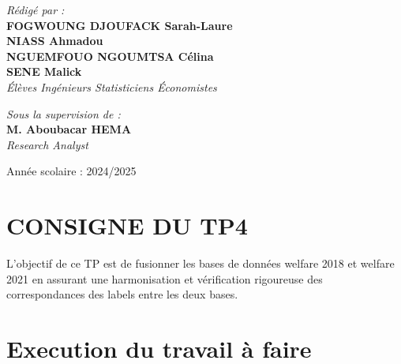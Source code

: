 \documentclass[
]{article}
\begin{document}
\begin{titlepage}
\begin{center}
        \vfill  
        
        \begin{minipage}{0.5\textwidth}
    \begin{flushleft} \large
        \emph{\textsf{Rédigé par :}}\\
        \textbf{FOGWOUNG DJOUFACK Sarah-Laure}\\
        \textbf{NIASS Ahmadou}\\
        \textbf{NGUEMFOUO NGOUMTSA Célina}\\
        \textbf{SENE Malick}\\
        \textit{Élèves Ingénieurs Statisticiens Économistes}
    \end{flushleft}
\end{minipage}
        \hfill
        \begin{minipage}{0.4\textwidth}
            \begin{flushright} \large
                \emph{\textsf{Sous la supervision de :}} \\
                \textbf{M. Aboubacar HEMA}\\
                \textit{Research Analyst }
            \end{flushright}
        \end{minipage}

        \vfill

        {\large \textsf{Année scolaire : 2024/2025}}\\[0.5cm]
        
    \end{center}
\end{titlepage}

\tableofcontents

\newpage

\hypertarget{consigne-du-tp4}{%
\section{CONSIGNE DU TP4}\label{consigne-du-tp4}}

L'objectif de ce TP est de fusionner les bases de données welfare 2018
et welfare 2021 en assurant une harmonisation et vérification rigoureuse
des correspondances des labels entre les deux bases.

\newpage

\hypertarget{execution-du-travail-uxe0-faire}{%
\section{Execution du travail à
faire}\label{execution-du-travail-uxe0-faire}}
\end{document}
